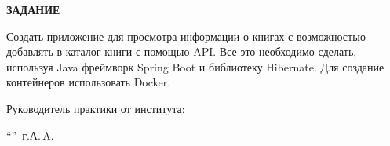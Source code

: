 \begin{center}
\bfseries{\large ЗАДАНИЕ}
\end{center}

Создать приложение для просмотра информации о книгах с возможностью добавлять в каталог книги с помощью API. Все это необходимо сделать, используя Java фреймворк Spring Boot и библиотеку Hibernate. Для создание контейнеров использовать Docker.

\vspace*{\fill}
Руководитель практики от института:

\vspace{5pt}
\enquote{\hspace{0.5cm}}  \the\year\,г. А.\,A. 
\pagebreak
